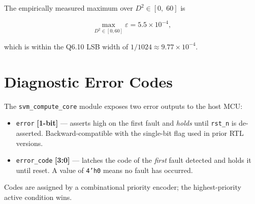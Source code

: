 \documentclass[11pt,a4paper]{article}
\begin{document}
The empirically measured maximum over $D^2 \in [0,\;60]$ is

\begin{equation}
  \max_{D^2 \in [0,60]} \varepsilon = 5.5 \times 10^{-4},
  \label{eq:max_err}
\end{equation}

which is within the Q6.10 LSB width of $1/1024 \approx 9.77\times10^{-4}$.

\section{Diagnostic Error Codes}

The \texttt{svm\_compute\_core} module exposes two error outputs to the host MCU:

\begin{itemize}
  \item \texttt{error} \textbf{[1-bit]} --- asserts high on the first fault and
        \emph{holds} until \texttt{rst\_n} is de-asserted.  Backward-compatible
        with the single-bit flag used in prior RTL versions.
  \item \texttt{error\_code} \textbf{[3:0]} --- latches the code of the
        \emph{first} fault detected and holds it until reset.  A value of
        \texttt{4'h0} means no fault has occurred.
\end{itemize}

Codes are assigned by a combinational priority encoder; the highest-priority
active condition wins.
\end{document}

